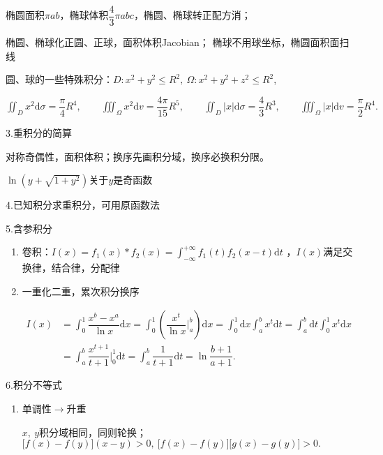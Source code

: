 \documentclass[UTF8]{ctexart}
\numberwithin{equation}{section}
\numberwithin{figure}{section}
\numberwithin{table}{section}
\newcommand\dif{\mathrm{d}}
\newcommand\no{\noindent}
\newcommand\dis{\displaystyle}
\newcommand\ls{\leqslant}
\newcommand\intd{\dis\int}
\begin{document}
\begin{spacing}{2}
\vspace{0.3cm}

椭圆面积$\pi ab$，椭球体积$\dfrac{4}{3}\pi abc$，椭圆、椭球转正配方消；

椭圆、椭球化正圆、正球，面积体积Jacobian；
椭球不用球坐标，椭圆面积面扫线

圆、球的一些特殊积分：$D:x^2+y^2\ls R^2,\ \Omega:x^2+y^2+z^2\ls R^2$,

$\dis\iint_D x^2\dif \sigma=\dfrac{\pi }{4}R^4,
\qquad
\dis\iiint_\Omega x^2\dif v=\dfrac{4\pi}{15}R^5,
\qquad
\dis\iint_D |x|\dif \sigma=\dfrac{4}{3}R^3,
\qquad
\dis\iiint_\Omega |x|\dif v=\dfrac{\pi}{2}R^4.$

\vspace{0.3cm}

\no3.重积分的简算

对称奇偶性，面积体积；换序先画积分域，换序必换积分限。

$\dis\ln\left(y+\sqrt{1+y^2}\right)$关于$y$是奇函数

\no4.已知积分求重积分，可用原函数法

\no5.含参积分

\begin{enumerate}[itemindent=1.4em, label=(\arabic*)]

\item 卷积：$\dis I(x)= f_1(x)*f_2(x)=\intd_{-\infty}^{+\infty}f_1(t)f_2(x-t)\dif t$
，$I(x)$满足交换律，结合律，分配律

\item 一重化二重，累次积分换序

\vspace{0.2cm}

$\begin{aligned}
I(x)&=\intd_0^1\dfrac{x^b-x^a}{\ln x}\dif x
=\intd_0^1\left(\dfrac{x^t}{\ln x}\bigg|_a^b\right)\dif x
=\intd_0^1\dif x\intd_a^bx^t\dif t
=\intd_a^b\dif t\intd_0^1x^t\dif x\\
&=\intd_a^b\dfrac{x^{t+1}}{t+1}\bigg|_0^1\dif t
=\intd_a^b\dfrac{1}{t+1}\dif t
=\ln \dfrac{b+1}{a+1}.
\end{aligned}$

\end{enumerate}

\no6.积分不等式

\begin{enumerate}[itemindent=1.4em, label=(\arabic*)]

\item 单调性$\longrightarrow$升重

$x,\ y$积分域相同，同则轮换；
$\big[f(x)-f(y)\big](x-y)>0,\ \big[f(x)-f(y)\big]\big[g(x)-g(y)\big]>0.$


\end{enumerate}
\end{spacing}
\end{document}
